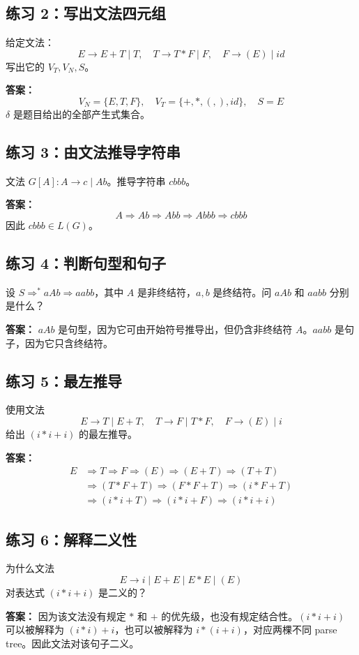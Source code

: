 \documentclass[UTF8,fontset=none,11pt]{ctexart}
\begin{document}
\subsection*{练习 2：写出文法四元组}
给定文法：
\[
E\to E+T\mid T,\quad T\to T*F\mid F,\quad F\to(E)\mid id
\]
写出它的 \(V_T,V_N,S\)。

\textbf{答案：}
\[
V_N=\{E,T,F\},\quad V_T=\{+,*,(,),id\},\quad S=E
\]
\(\delta\) 是题目给出的全部产生式集合。

\subsection*{练习 3：由文法推导字符串}
文法 \(G[A]:A\to c\mid Ab\)。推导字符串 \(cbbb\)。

\textbf{答案：}
\[
A\Rightarrow Ab\Rightarrow Abb\Rightarrow Abbb\Rightarrow cbbb
\]
因此 \(cbbb\in L(G)\)。

\subsection*{练习 4：判断句型和句子}
设 \(S\Rightarrow^* aAb\Rightarrow aabb\)，其中 \(A\) 是非终结符，\(a,b\) 是终结符。问 \(aAb\) 和 \(aabb\) 分别是什么？

\textbf{答案：}
\(aAb\) 是句型，因为它可由开始符号推导出，但仍含非终结符 \(A\)。\(aabb\) 是句子，因为它只含终结符。

\subsection*{练习 5：最左推导}
使用文法
\[
E\to T\mid E+T,\quad T\to F\mid T*F,\quad F\to(E)\mid i
\]
给出 \((i*i+i)\) 的最左推导。

\textbf{答案：}
\[
\begin{aligned}
E&\Rightarrow T\Rightarrow F\Rightarrow (E)\Rightarrow(E+T)\Rightarrow(T+T)\\
&\Rightarrow(T*F+T)\Rightarrow(F*F+T)\Rightarrow(i*F+T)\\
&\Rightarrow(i*i+T)\Rightarrow(i*i+F)\Rightarrow(i*i+i)
\end{aligned}
\]

\subsection*{练习 6：解释二义性}
为什么文法
\[
E\to i\mid E+E\mid E*E\mid(E)
\]
对表达式 \((i*i+i)\) 是二义的？

\textbf{答案：}
因为该文法没有规定 \(*\) 和 \(+\) 的优先级，也没有规定结合性。\((i*i+i)\) 可以被解释为 \((i*i)+i\)，也可以被解释为 \(i*(i+i)\)，对应两棵不同 parse tree。因此文法对该句子二义。
\end{document}
